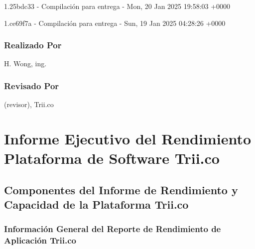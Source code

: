 \documentclass[
  paper=a4,
  ,captions=tableheading
]{scrartcl}
\renewenvironment{quote}{\begin{customblockquote}\list{}{\rightmargin=0em\leftmargin=0em}%
\item\relax\color{blockquote-text}\ignorespaces}{\unskip\unskip\endlist\end{customblockquote}}
\begin{document}
1.25bdc33 - Compilación para entrega - Mon, 20 Jan 2025 19:58:03 +0000

1.ce69f7a - Compilación para entrega - Sun, 19 Jan 2025 04:28:26 +0000

\subsubsection{Realizado Por}\label{sec:realizado-por}

H. Wong, ing.

\subsubsection{Revisado Por}\label{sec:revisado-por}

(revisor), Trii.co

\newpage

\section{Informe Ejecutivo del Rendimiento Plataforma de Software
Trii.co}\label{sec:informe-ejecutivo-del-rendimiento-plataforma-de-software-trii.co}

\subsection{Componentes del Informe de Rendimiento y Capacidad de la
Plataforma
Trii.co}\label{sec:componentes-del-informe-de-rendimiento-y-capacidad-de-la-plataforma-trii.co}

\begin{quote}
\end{quote}

\subsubsection{Información General del Reporte de Rendimiento de
Aplicación
Trii.co}\label{sec:informaciuxf3n-general-del-reporte-de-rendimiento-de-aplicaciuxf3n-trii.co}
\end{document}
